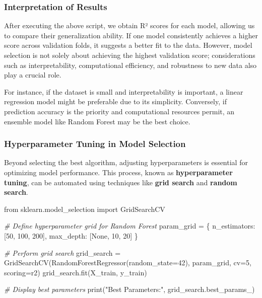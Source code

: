 \documentclass{article}
\newenvironment{Shaded}{}{}
\newcommand{\DecValTok}[1]{\textcolor[rgb]{0.25,0.63,0.44}{{#1}}}
\newcommand{\StringTok}[1]{\textcolor[rgb]{0.25,0.44,0.63}{{#1}}}
\newcommand{\CommentTok}[1]{\textcolor[rgb]{0.38,0.63,0.69}{\textit{{#1}}}}
\newcommand{\NormalTok}[1]{{#1}}
\newcommand{\ImportTok}[1]{{#1}}
\newcommand{\VariableTok}[1]{\textcolor[rgb]{0.10,0.09,0.49}{{#1}}}
\newcommand{\OperatorTok}[1]{\textcolor[rgb]{0.40,0.40,0.40}{{#1}}}
\newcommand{\BuiltInTok}[1]{{#1}}
\begin{document}
\subsubsection{Interpretation of
Results}\label{interpretation-of-results}

After executing the above script, we obtain R² scores for each model,
allowing us to compare their generalization ability. If one model
consistently achieves a higher score across validation folds, it
suggests a better fit to the data. However, model selection is not
solely about achieving the highest validation score; considerations such
as interpretability, computational efficiency, and robustness to new
data also play a crucial role.

For instance, if the dataset is small and interpretability is important,
a linear regression model might be preferable due to its simplicity.
Conversely, if prediction accuracy is the priority and computational
resources permit, an ensemble model like Random Forest may be the best
choice.

\subsubsection{Hyperparameter Tuning in Model
Selection}\label{hyperparameter-tuning-in-model-selection}

Beyond selecting the best algorithm, adjusting hyperparameters is
essential for optimizing model performance. This process, known as
\textbf{hyperparameter tuning}, can be automated using techniques like
\textbf{grid search} and \textbf{random search}.

\begin{Shaded}
\begin{Highlighting}[]
\ImportTok{from}\NormalTok{ sklearn.model\_selection }\ImportTok{import}\NormalTok{ GridSearchCV}

\CommentTok{\# Define hyperparameter grid for Random Forest}
\NormalTok{param\_grid }\OperatorTok{=}\NormalTok{ \{}
    \StringTok{\textquotesingle{}n\_estimators\textquotesingle{}}\NormalTok{: [}\DecValTok{50}\NormalTok{, }\DecValTok{100}\NormalTok{, }\DecValTok{200}\NormalTok{],}
    \StringTok{\textquotesingle{}max\_depth\textquotesingle{}}\NormalTok{: [}\VariableTok{None}\NormalTok{, }\DecValTok{10}\NormalTok{, }\DecValTok{20}\NormalTok{]}
\NormalTok{\}}

\CommentTok{\# Perform grid search}
\NormalTok{grid\_search }\OperatorTok{=}\NormalTok{ GridSearchCV(RandomForestRegressor(random\_state}\OperatorTok{=}\DecValTok{42}\NormalTok{), param\_grid, cv}\OperatorTok{=}\DecValTok{5}\NormalTok{, scoring}\OperatorTok{=}\StringTok{\textquotesingle{}r2\textquotesingle{}}\NormalTok{)}
\NormalTok{grid\_search.fit(X\_train, y\_train)}

\CommentTok{\# Display best parameters}
\BuiltInTok{print}\NormalTok{(}\StringTok{"Best Parameters:"}\NormalTok{, grid\_search.best\_params\_)}
\end{Highlighting}
\end{Shaded}
\end{document}
